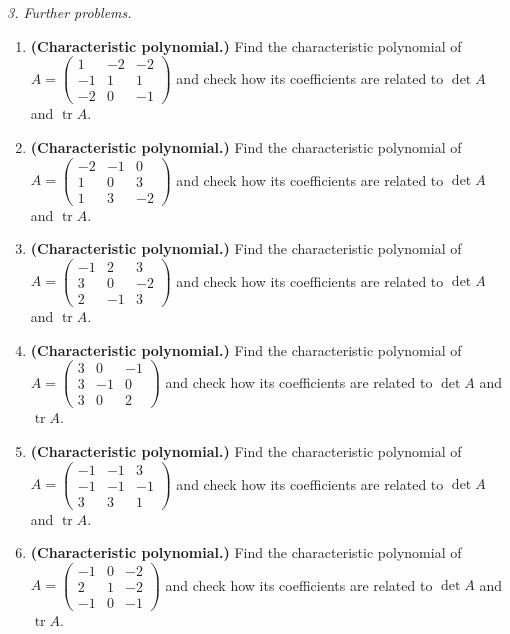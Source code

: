 \emph{3. Further problems.}
\bigskip
\begin{enumerate}[label=\arabic*., leftmargin=*]
\item \textbf{(Characteristic polynomial.)} Find the characteristic polynomial of $A=\begin{pmatrix}1 & -2 & -2\\ -1 & 1 & 1\\ -2 & 0 & -1\end{pmatrix}$ and check how its coefficients are related to $\det A$ and $\operatorname{tr}A$.
\item \textbf{(Characteristic polynomial.)} Find the characteristic polynomial of $A=\begin{pmatrix}-2 & -1 & 0\\ 1 & 0 & 3\\ 1 & 3 & -2\end{pmatrix}$ and check how its coefficients are related to $\det A$ and $\operatorname{tr}A$.
\item \textbf{(Characteristic polynomial.)} Find the characteristic polynomial of $A=\begin{pmatrix}-1 & 2 & 3\\ 3 & 0 & -2\\ 2 & -1 & 3\end{pmatrix}$ and check how its coefficients are related to $\det A$ and $\operatorname{tr}A$.
\item \textbf{(Characteristic polynomial.)} Find the characteristic polynomial of $A=\begin{pmatrix}3 & 0 & -1\\ 3 & -1 & 0\\ 3 & 0 & 2\end{pmatrix}$ and check how its coefficients are related to $\det A$ and $\operatorname{tr}A$.
\item \textbf{(Characteristic polynomial.)} Find the characteristic polynomial of $A=\begin{pmatrix}-1 & -1 & 3\\ -1 & -1 & -1\\ 3 & 3 & 1\end{pmatrix}$ and check how its coefficients are related to $\det A$ and $\operatorname{tr}A$.
\item \textbf{(Characteristic polynomial.)} Find the characteristic polynomial of $A=\begin{pmatrix}-1 & 0 & -2\\ 2 & 1 & -2\\ -1 & 0 & -1\end{pmatrix}$ and check how its coefficients are related to $\det A$ and $\operatorname{tr}A$.

\end{enumerate}
